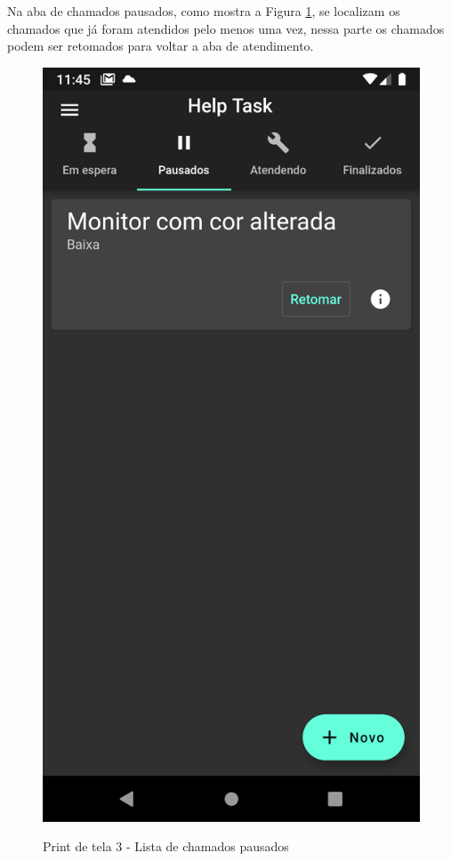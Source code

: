 Na aba de chamados pausados, como mostra a Figura \ref{fig:3_pausados}, se localizam os chamados  que já foram atendidos pelo menos uma vez, nessa parte os chamados podem ser retomados para voltar a aba de atendimento.
\begin{figure}[htb]
     \caption{Print de tela 3 - Lista de chamados pausados}
     \centering
     \begin{frame}{
     \includegraphics [scale = 0.2]{img/screenshots/3_pausados.png}}
     \end{frame}
     \label{fig:3_pausados}
 \end{figure}
\newpage

